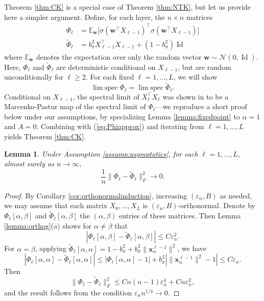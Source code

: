 \documentclass{article}
\newtheorem{lemma}[theorem]{Lemma}
\theoremstyle{definition}
\newcommand{\N}{\mathcal{N}}
\newcommand{\E}{\mathbb{E}}
\newcommand{\Id}{\operatorname{Id}}
\newcommand{\x}{\mathbf{x}}
\newcommand{\w}{\mathbf{w}}
\renewcommand{\a}{\alpha}
\renewcommand{\b}{\beta}
\newcommand{\eps}{\varepsilon}
\newcommand{\1}{\mathbf{1}}
\newcommand{\limspec}{\operatorname{lim\;spec}}
\begin{document}
Theorem \ref{thm:CK} is a special case of Theorem \ref{thm:NTK}, but let us
provide here a simpler argument. Define, for each layer, the $n \times n$
matrices
\begin{align}
\Phi_\ell&=\E_{\w}\Big[\sigma(\w^\top X_{\ell-1})^\top
\sigma(\w^\top X_{\ell-1})\Big]\label{eq:Phiell}\\
\tilde{\Phi}_\ell&=b_\sigma^2 X_{\ell-1}^\top X_{\ell-1}+(1-b_\sigma^2)\Id
\label{eq:tildePhiell}
\end{align}
where $\E_\w$ denotes the expectation over only the random vector $\w \sim
\N(0,\Id)$. Here, $\Phi_\ell$ and $\tilde{\Phi}_\ell$ are deterministic
conditional on $X_{\ell-1}$, but are random unconditionally for $\ell \geq 2$.
For each fixed $\ell=1,\ldots,L$, we will show
\begin{equation}\label{eq:Phiapprox}
\limspec \Phi_\ell=\limspec \tilde{\Phi}_\ell.
\end{equation}
Conditional on $X_{\ell-1}$, the spectral limit of $X_\ell^\top X_\ell$ was
shown in \cite{louart2018random} to be a Marcenko-Pastur map of the spectral
limit of $\Phi_\ell$---we reproduce a short proof below under our assumptions,
by specializing Lemma \ref{lemma:fixedpoint} to $\alpha=1$ and $A=0$.
Combining with (\ref{eq:Phiapprox}) and
iterating from $\ell=1,\ldots,L$ yields Theorem \ref{thm:CK}.

\begin{lemma}\label{lemma:difference_Phi}
Under Assumption \ref{assump:asymptotics}, for each $\ell=1,\ldots,L$,
almost surely as $n \to \infty$, 
\[\frac{1}{n}\|\Phi_\ell-\tilde{\Phi}_\ell\|_F^2 \to 0.\]
\end{lemma}
\begin{proof}
By Corollary \ref{cor:orthonormalinduction}, increasing $(\eps_n,B)$ as
needed, we may assume that each matrix $X_0,\ldots,X_L$ is
$(\eps_n,B)$-orthonormal.
Denote by $\Phi_\ell[\a,\b]$ and $\tilde{\Phi}_\ell[\a,\b]$ the $(\a,\b)$
entries of these matrices. Then Lemma \ref{lemma:orthog}(a) shows
for $\a \neq \b$ that
\[|\Phi_\ell[\a,\b]-\tilde{\Phi}_\ell[\a,\b]|
\leq C\eps_n^2.\]
For $\a=\b$, applying $\tilde{\Phi}_\ell[\alpha,\alpha]=1-b_\sigma^2+
b_\sigma^2 \|\x_\a^{\ell-1}\|^2$, we have
\[|\Phi_\ell[\a,\a]-\tilde{\Phi}_\ell[\a,\a]|
\leq |\Phi_\ell[\a,\a]-1|+b_\sigma^2|\|\x^{\ell-1}_\a\|^2-1|
\leq C\eps_n.\]
Then
\[\|\Phi_\ell-\tilde{\Phi}_\ell\|_F^2
\leq Cn(n-1)\eps_n^4+Cn\eps_n^2,\]
and the result follows from the condition $\eps_n n^{1/4} \to 0$.
\end{proof}
\end{document}
